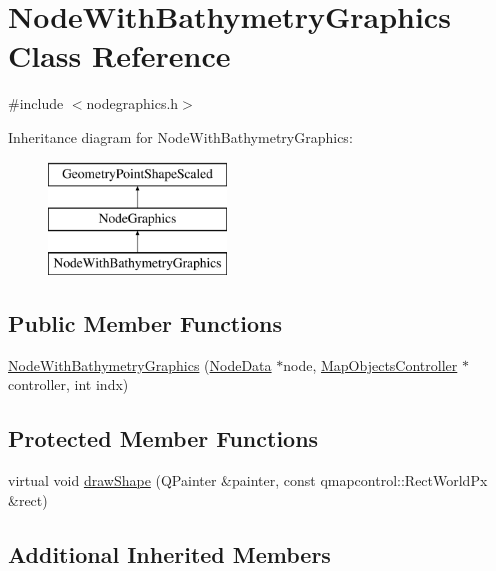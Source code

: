 \hypertarget{class_node_with_bathymetry_graphics}{}\section{Node\+With\+Bathymetry\+Graphics Class Reference}
\label{class_node_with_bathymetry_graphics}


{\ttfamily \#include $<$nodegraphics.\+h$>$}

Inheritance diagram for Node\+With\+Bathymetry\+Graphics\+:\begin{figure}[H]
\begin{center}
\leavevmode
\includegraphics[height=3.000000cm]{d2/dfc/class_node_with_bathymetry_graphics}
\end{center}
\end{figure}
\subsection*{Public Member Functions}
\begin{DoxyCompactItemize}
\item 
\mbox{\hyperlink{class_node_with_bathymetry_graphics_afb7a0ee012510ab131398ae83ee92417}{Node\+With\+Bathymetry\+Graphics}} (\mbox{\hyperlink{class_node_data}{Node\+Data}} $\ast$node, \mbox{\hyperlink{class_map_objects_controller}{Map\+Objects\+Controller}} $\ast$controller, int indx)
\end{DoxyCompactItemize}
\subsection*{Protected Member Functions}
\begin{DoxyCompactItemize}
\item 
virtual void \mbox{\hyperlink{class_node_with_bathymetry_graphics_a6ddfcf03efd428c475d2507b6c1b6b32}{draw\+Shape}} (Q\+Painter \&painter, const qmapcontrol\+::\+Rect\+World\+Px \&rect)
\end{DoxyCompactItemize}
\subsection*{Additional Inherited Members}


